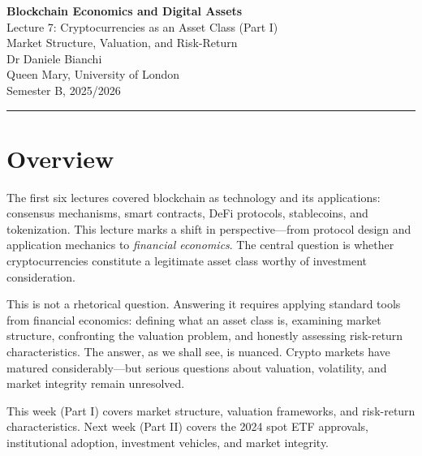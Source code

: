 \documentclass[11pt,a4paper]{article}
\begin{document}
\begin{center}
    {\LARGE\bfseries\textcolor{ImperialBlue}{Blockchain Economics and Digital Assets}}\\[0.5em]
    {\Large Lecture 7: Cryptocurrencies as an Asset Class (Part I)}\\[0.3em]
    {\large Market Structure, Valuation, and Risk-Return}\\[1em]
    {\large Dr Daniele Bianchi}\\[0.5em]
    {\normalsize Queen Mary, University of London}\\[0.3em]
    {\normalsize Semester B, 2025/2026}
\end{center}

\vspace{1em}
\hrule
\vspace{1em}

\tableofcontents

\vspace{2cm}

\section*{Overview}

The first six lectures covered blockchain as technology and its applications: consensus mechanisms, smart contracts, DeFi protocols, stablecoins, and tokenization. This lecture marks a shift in perspective---from protocol design and application mechanics to \textit{financial economics}. The central question is whether cryptocurrencies constitute a legitimate asset class worthy of investment consideration.

This is not a rhetorical question. Answering it requires applying standard tools from financial economics: defining what an asset class is, examining market structure, confronting the valuation problem, and honestly assessing risk-return characteristics. The answer, as we shall see, is nuanced. Crypto markets have matured considerably---but serious questions about valuation, volatility, and market integrity remain unresolved.

This week (Part I) covers market structure, valuation frameworks, and risk-return characteristics. Next week (Part II) covers the 2024 spot ETF approvals, institutional adoption, investment vehicles, and market integrity.
\end{document}

